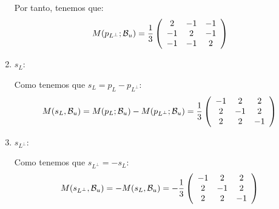 \begin{ejercicio}
\begin{enumerate}
        Por tanto, tenemos que:
        \begin{equation*}
            M(p_{L^\perp};\mathcal{B}_u) = \frac{1}{3}\left(\begin{array}{ccc}
                 2 & -1 & -1 \\
                 -1 & 2 & -1 \\
                 -1 & -1 & 2 \\
            \end{array}\right)
        \end{equation*}

        \item $s_L$:

        Como tenemos que $s_L = p_L - p_{L^\perp}$:
        \begin{equation*}
            M(s_L, \mathcal{B}_u)=M(p_{L};\mathcal{B}_u)-M(p_{L^\perp};\mathcal{B}_u) = \frac{1}{3}\left(\begin{array}{ccc}
                 -1 & 2 & 2 \\
                 2 & -1 & 2 \\
                 2 & 2 & -1 \\
            \end{array}\right)
        \end{equation*}

        \item $s_{L^\perp}$:

        Como tenemos que $s_{L^\perp} = -s_L$:
        \begin{equation*}
            M(s_{L^\perp}, \mathcal{B}_u)= -M(s_L, \mathcal{B}_u)=-\frac{1}{3}\left(\begin{array}{ccc}
                 -1 & 2 & 2 \\
                 2 & -1 & 2 \\
                 2 & 2 & -1 \\
            \end{array}\right)
        \end{equation*}
        
    \end{enumerate}

    
\end{ejercicio}

